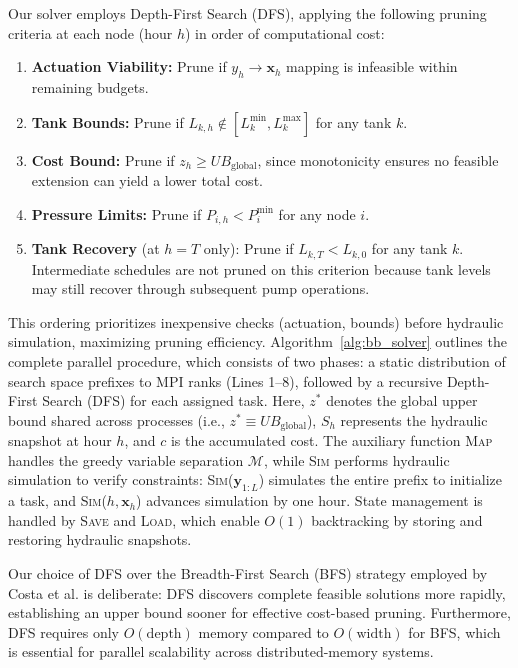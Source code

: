 \documentclass[final,3p,twocolumn]{elsarticle}
\begin{document}
Our solver employs Depth-First Search (DFS), applying the following pruning criteria at each node (hour $h$) in order of computational cost:
\begin{enumerate}
	\item \textbf{Actuation Viability:} Prune if $y_h \to \mathbf{x}_h$ mapping is infeasible within remaining budgets.
	\item \textbf{Tank Bounds:} Prune if $L_{k,h} \notin [L_{k}^{\min}, L_{k}^{\max}]$ for any tank $k$.
	\item \textbf{Cost Bound:} Prune if $z_h \ge UB_{\text{global}}$, since monotonicity ensures no feasible extension can yield a lower total cost.
	\item \textbf{Pressure Limits:} Prune if $P_{i,h} < P_{i}^{\min}$ for any node $i$.
	\item \textbf{Tank Recovery} (at $h=T$ only): Prune if $L_{k,T} < L_{k,0}$ for any tank $k$. Intermediate schedules are not pruned on this criterion because tank levels may still recover through subsequent pump operations.
\end{enumerate}
This ordering prioritizes inexpensive checks (actuation, bounds) before hydraulic simulation, maximizing pruning efficiency. Algorithm~\ref{alg:bb_solver} outlines the complete parallel procedure, which consists of two phases: a static distribution of search space prefixes to MPI ranks (Lines 1--8), followed by a recursive Depth-First Search (DFS) for each assigned task. Here, $z^*$ denotes the global upper bound shared across processes (i.e., $z^* \equiv UB_{\text{global}}$), $S_h$ represents the hydraulic snapshot at hour $h$, and $c$ is the accumulated cost. The auxiliary function \textsc{Map} handles the greedy variable separation $\mathcal{M}$, while \textsc{Sim} performs hydraulic simulation to verify constraints: \textsc{Sim}($\mathbf{y}_{1:L}$) simulates the entire prefix to initialize a task, and \textsc{Sim}($h, \mathbf{x}_h$) advances simulation by one hour. State management is handled by \textsc{Save} and \textsc{Load}, which enable $O(1)$ backtracking by storing and restoring hydraulic snapshots.

Our choice of DFS over the Breadth-First Search (BFS) strategy employed by Costa et al. \cite{Costa2016} is deliberate: DFS discovers complete feasible solutions more rapidly, establishing an upper bound sooner for effective cost-based pruning. Furthermore, DFS requires only $O(\text{depth})$ memory compared to $O(\text{width})$ for BFS, which is essential for parallel scalability across distributed-memory systems.
\end{document}
